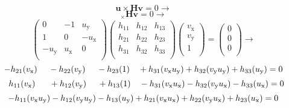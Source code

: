 \begin{equation}
\mathbf{u} \times \mathbf{H}\mathbf{v}=0 \rightarrow
\label{eqn:H-cross}
\end{equation}
\begin{equation}
[\mathbf{u}]_{\times} \mathbf{H}\mathbf{v}=0 \rightarrow
\end{equation}
\begin{equation}
\begin{pmatrix}
0 & -1 & u_\mathrm{y} \\
1 & 0 & -u_\mathrm{x} \\
-u_\mathrm{y} & u_\mathrm{x} & 0 \\
\end{pmatrix}
\begin{pmatrix}
h_{11} & h_{12} & h_{13} \\
h_{21} & h_{22} & h_{23} \\
h_{31} & h_{32} & h_{33} \\
\end{pmatrix}
\begin{pmatrix}
v_\mathrm{x} \\
v_\mathrm{y} \\
1 \\
\end{pmatrix}
=
\begin{pmatrix}
0 \\
0 \\
0 \\
\end{pmatrix}
\rightarrow
\end{equation}
\begin{equation}
-h_{21} (v_\mathrm{x}) \ \ \ \ - h_{22} (v_\mathrm{y}) \ \ \ \ - h_{23} (1) \ \ \ + h_{31} (v_\mathrm{x} u_\mathrm{y}) + h_{32} (v_\mathrm{y} u_\mathrm{y}) + h_{33} (u_\mathrm{y}) = 0 \\
\label{eqn:H-1}
\end{equation}
\begin{equation}
\ \ h_{11} (v_\mathrm{x}) \ \ \ \ \ + h_{12} (v_\mathrm{y}) \ \ \ \ + h_{13} (1) \ \ \ -h_{31} (v_\mathrm{x} u_\mathrm{x}) -h_{32} (v_\mathrm{y} u_\mathrm{x}) - h_{33} (u_\mathrm{x}) = 0 \\
\label{eqn:H-2}
\end{equation}
\begin{equation}
-h_{11} (v_\mathrm{x} u_\mathrm{y}) -h_{12} (v_\mathrm{y} u_\mathrm{y}) -h_{13} (u_\mathrm{y}) + h_{21} (v_\mathrm{x} u_\mathrm{x}) + h_{22} (v_\mathrm{y} u_\mathrm{x}) + h_{23} (u_\mathrm{x}) = 0 \\
\label{eqn:H-3}
\end{equation}

